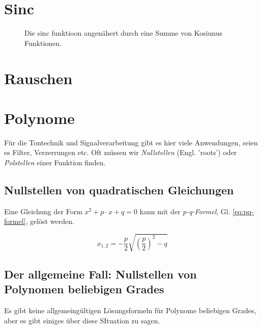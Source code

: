 
\section{Sinc}

\begin{figure}[H]
	\centering
	
	\caption{Die sinc funktioon angenähert durch eine Summe von Kosiunus Funktionen.}
	\label{fig:sincAsSum}
\end{figure}

\section{Rauschen}
\section{Polynome}


Für die Tontechnik und Signalverarbeitung gibt es hier viele Anwendungen, seien es Filter, Verzerrungen etc. Oft müssen wir \emph{Nullstellen} (Engl. 'roots') oder \emph{Polstellen} einer Funktion finden. 

\subsection{Nullstellen von quadratischen Gleichungen}

Eine Gleichung der Form $x^2 + p \cdot x + q = 0$ kann mit der \emph{p-q-Formel}, Gl. \ref{eq:pq-formel}, gelöst werden.


\begin{equation}
x_{1,2} = -\frac{p}{2} \sqrt{\left( \frac{p}{2} \right)^2 - q } \label{eq:pq-formel}
\end{equation}

\subsection{Der allgemeine Fall: Nullstellen von Polynomen beliebigen Grades}
Es gibt keine allgemeingültigen Lösungsformeln für Polynome beliebigen Grades, aber es gibt einiges über diese SItuation zu sagen.

